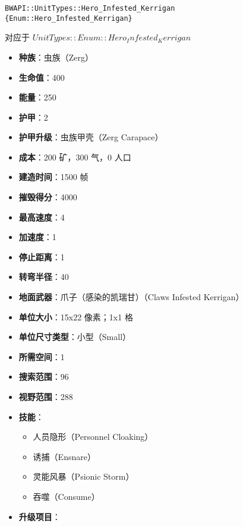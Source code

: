 \begin{tcolorbox}[colback=white, colframe=black!60!white, title=Hero\_Infested\_Kerrigan(), arc=0mm]
    \begin{verbatim}
BWAPI::UnitTypes::Hero_Infested_Kerrigan {Enum::Hero_Infested_Kerrigan}
    \end{verbatim}
    对应于  $ UnitTypes::Enum::Hero_Infested_Kerrigan $ 
    \begin{itemize}
        \item \textbf{种族}：虫族（Zerg）
        \item \textbf{生命值}：400
        \item \textbf{能量}：250
        \item \textbf{护甲}：2
        \item \textbf{护甲升级}：虫族甲壳（Zerg Carapace）
        \item \textbf{成本}：200 矿，300 气，0 人口
        \item \textbf{建造时间}：1500 帧
        \item \textbf{摧毁得分}：4000
        \item \textbf{最高速度}：4
        \item \textbf{加速度}：1
        \item \textbf{停止距离}：1
        \item \textbf{转弯半径}：40
        \item \textbf{地面武器}：爪子（感染的凯瑞甘）（Claws Infested Kerrigan）
        \item \textbf{单位大小}：15x22 像素；1x1 格
        \item \textbf{单位尺寸类型}：小型（Small）
        \item \textbf{所需空间}：1
        \item \textbf{搜索范围}：96
        \item \textbf{视野范围}：288
        \item \textbf{技能}：
            \begin{itemize}
                \item 人员隐形（Personnel Cloaking）
                \item 诱捕（Ensnare）
                \item 灵能风暴（Psionic Storm）
                \item 吞噬（Consume）
            \end{itemize}
        \item \textbf{升级项目}：
            \begin{itemize}

\end{itemize}
\end{itemize}
\end{tcolorbox}
